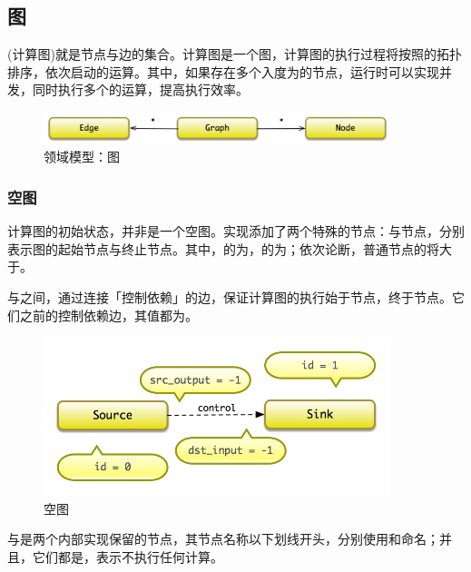 \begin{content}
\subsection{图}

(计算图)就是节点与边的集合。计算图是一个图，计算图的执行过程将按照的拓扑排序，依次启动的运算。其中，如果存在多个入度为的节点，运行时可以实现并发，同时执行多个的运算，提高执行效率。

\begin{figure}[!htbp]
\centering
\includegraphics[width=0.9\textwidth]{figures/cc-graph-model.png}
\caption{领域模型：图}
 \label{fig:cc-graph-model}
\end{figure}

\subsubsection{空图}

计算图的初始状态，并非是一个空图。实现添加了两个特殊的节点：与节点，分别表示图的起始节点与终止节点。其中，的为，的为；依次论断，普通节点的将大于。

与之间，通过连接「控制依赖」的边，保证计算图的执行始于节点，终于节点。它们之前的控制依赖边，其值都为。

\begin{figure}[!htbp]
\centering
\includegraphics[width=0.9\textwidth]{figures/cc-empty-graph.png}
\caption{空图}
 \label{fig:cc-empty-graph}
\end{figure}

与是两个内部实现保留的节点，其节点名称以下划线开头，分别使用和命名；并且，它们都是，表示不执行任何计算。


\end{content}

